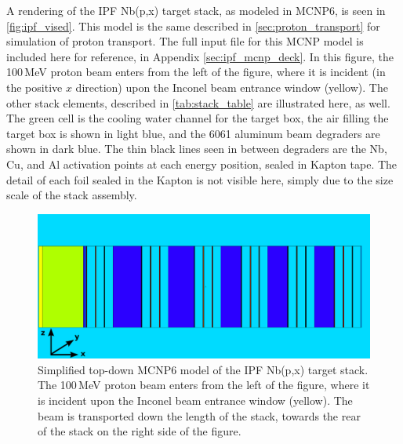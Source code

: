 A rendering of the IPF Nb(p,x) target stack, as modeled in MCNP6, is seen in \autoref{fig:ipf_vised}.
This model is the same described in \autoref{sec:proton_transport} for simulation of proton transport.
The full input file for this MCNP model is included here for reference, in Appendix \ref{sec:ipf_mcnp_deck}.
In this figure, the 100\,MeV proton beam enters from the left of the figure, where it is incident (in the positive $x$ direction) upon the Inconel beam entrance window (yellow).
The other stack elements, described in  \autoref{tab:stack_table} are illustrated here, as well.
The green cell is the cooling water channel for the target box, the air filling the target box is shown in light blue, and the 6061 aluminum beam degraders are shown in dark blue.  
The thin black lines seen in between degraders are the Nb, Cu, and Al activation points at each energy position, sealed in Kapton tape. 
The detail of each foil sealed in the Kapton is not visible here, simply due to the size scale of the stack assembly.


\begin{figure}
 \centering
 \includegraphics[trim = 0mm 0mm 2mm 0mm, clip,width=0.75\columnwidth]{./figures/ipf_stack_nolabels_axes.PNG}
 \caption{Simplified top-down MCNP6 model of the IPF Nb(p,x) target stack. The 100\,MeV proton beam enters from the left of the figure, where it is incident upon the Inconel beam entrance window (yellow). The beam is transported down the length of the stack, towards the rear of the stack on the right side of the figure.
}
 \label{fig:ipf_vised}
\end{figure}




